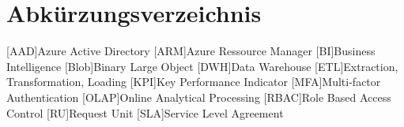 \renewcommand{\chaptermark}[1]{\markboth{\spacedlowsmallcaps{#1}}{\spacedlowsmallcaps{#1}}}
\renewcommand{\sectionmark}[1]{\markright{\thesection\enspace\spacedlowsmallcaps{#1}}}
\chapter*{Abk\"{u}rzungsverzeichnis}

\begin{acronym}[RBAC]
    [AAD]{Azure Active Directory}
    [ARM]{Azure Ressource Manager}
    [BI]{Business Intelligence}
    [Blob]{Binary Large Object}
    [DWH]{Data Warehouse}
    [ETL]{Extraction, Transformation, Loading}
    [KPI]{Key Performance Indicator}
    [MFA]{Multi-factor Authentication}
    [OLAP]{Online Analytical Processing}
    [RBAC]{Role Based Access Control}
    [RU]{Request Unit}
    [SLA]{Service Level Agreement}
\end{acronym}

\cleardoublepage
